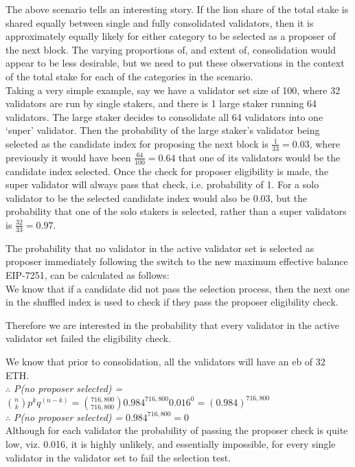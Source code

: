 The above scenario tells an interesting story. If the lion share of the total stake is shared equally between single and fully consolidated validators, then it is approximately equally likely for either category to be selected as a proposer of the next block. The varying proportions of, and extent of, consolidation would appear to be less desirable, but we need to put these observations in the context of the total stake for each of the categories in the scenario. \\

Taking a very simple example, say we have a validator set size of 100, where 32 validators are run by single stakers, and there is 1 large staker running 64 validators. The large staker decides to consolidate all 64 validators into one `super' validator. Then the probability of the large staker's validator being selected as the candidate index for proposing the next block is $\frac{1}{33} = 0.03$, where previously it would have been $\frac{64}{100} = 0.64$ that one of its validators would be the candidate index selected. Once the check for proposer eligibility is made, the super validator will always pass that check, i.e. probability of 1. For a solo validator to be the selected candidate index would also be 0.03, but the probability that one of the solo stakers is selected, rather than a super validators is $\frac{32}{33} = 0.97$.

\noindent
\clearpage
\noindent
The probability that no validator in the active validator set is selected as proposer immediately following the switch to the new maximum effective balance EIP-7251, can be calculated as follows:\\

We know that if a candidate did not pass the selection process, then the next one in the shuffled index is used to check if they pass the proposer eligibility check. 

Therefore we are interested in the probability that every  validator in the active validator set failed the eligibility check.

We know that prior to consolidation, all the validators will have an \gls{eb} of 32 ETH.\\
$\therefore$ \textit{ P(no proposer selected) =} $\binom{n}{k} p^k q^{(n-k)} = \binom{716,800}{716,800} 0.984^{716,800}0.016^0 = (0.984)^{716,800}$\\
$\therefore$ \textit{ P(no proposer selected) = } $0.984^{716,800} = 0$ \\
Although for each validator the probability of passing the proposer check is quite low, viz. 0.016, it is highly unlikely, and essentially impossible, for every single validator in the validator set to fail the selection test.\\

